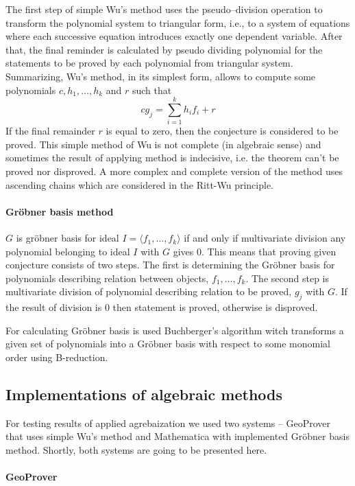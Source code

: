 \documentclass[final,1p,times,authoryear]{elsarticle}
\begin{document}
The first step of simple Wu’s method \cite{} uses the pseudo--division
operation to transform the polynomial system to triangular form, i.e.,
to a system of equations where each successive equation introduces
exactly one dependent variable. After that, the final reminder is
calculated by pseudo dividing polynomial for the statements to be
proved by each polynomial from triangular system.  Summarizing, Wu’s
method, in its simplest form, allows to compute some polynomials $c,
h_1, \ldots, h_k$ and $r$ such that
$$cg_j = \sum_{i=1}^{k}h_if_i + r$$ If the final remainder $r$ is
equal to zero, then the conjecture is considered to be proved. This
simple method of Wu is not complete (in algebraic sense) and
sometimes the result of applying method is indecisive, i.e. the
theorem can't be proved nor disproved. A more complex and complete
version of the method uses ascending chains which are considered in
the Ritt-Wu principle.

\paragraph{Gr\"obner basis method}

$G$ is gr\"obner basis for ideal $I = \langle f_1, \ldots, f_k
\rangle$ if and only if multivariate division any polynomial belonging
to ideal $I$ with $G$ gives $0$. This means that proving given
conjecture consists of two steps. The first is determining the
Gr\"obner basis for polynomials describing relation between objects,
$f_1, \ldots, f_k$. The second step is multivariate division of
polynomial describing relation to be proved, $g_j$ with $G$. If the
result of division is $0$ then statement is proved, otherwise is
disproved.

For calculating Gr\"obner basis is used Buchberger's algorithm witch
transforms a given set of polynomials into a Gr\"obner basis with
respect to some monomial order using B-reduction.

\subsection{Implementations of algebraic methods}

For testing results of applied agrebaization we used two systems --
GeoProver that uses simple Wu's method and Mathematica with
implemented Gr\"obner basis method. Shortly, both systems are going to
be presented here.

\paragraph{GeoProver}
\end{document}
